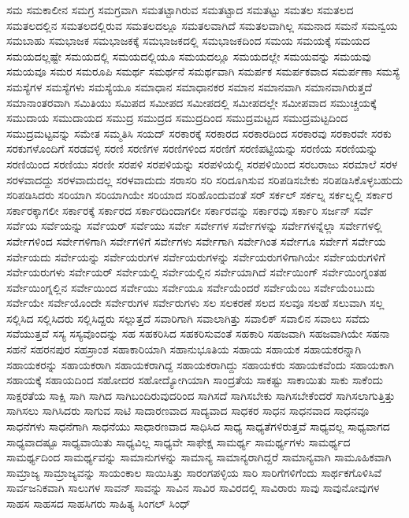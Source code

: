 {ಸಮ
ಸಮಕಾಲೀನ
ಸಮಗ್ರ
ಸಮಗ್ರವಾಗಿ
ಸಮತಟ್ಟಾಗಿರುವ
ಸಮತಟ್ಟಾದ
ಸಮತಟ್ಟು
ಸಮತಲ
ಸಮತಲದ
ಸಮತಲದಲ್ಲಿನ
ಸಮತಲದಲ್ಲಿರುವ
ಸಮತಲದಲ್ಲೂ
ಸಮತಲವಾಗಿದೆ
ಸಮತಲವಾಗಿಲ್ಲ
ಸಮನಾದ
ಸಮನೆ
ಸಮನ್ವಯ
ಸಮಬಾಹು
ಸಮಭಾಜಕ
ಸಮಭಾಜಕಕ್ಕೆ
ಸಮಭಾಜಕದಲ್ಲಿ
ಸಮಭಾಜಕದಿಂದ
ಸಮಯ
ಸಮಯಕ್ಕೆ
ಸಮಯದ
ಸಮಯದಲ್ಲಷ್ಟೇ
ಸಮಯದಲ್ಲಿ
ಸಮಯದಲ್ಲಿಯೂ
ಸಮಯದಲ್ಲೂ
ಸಮಯದಲ್ಲೇ
ಸಮಯವನ್ನು
ಸಮಯವು
ಸಮಯವೂ
ಸಮರ
ಸಮರೂಪಿ
ಸಮರ್ಥ
ಸಮರ್ಥನೆ
ಸಮರ್ಥವಾಗಿ
ಸಮರ್ಪಕ
ಸಮರ್ಪಕವಾದ
ಸಮರ್ಪಣಾ
ಸಮಸ್ಯೆ
ಸಮಸ್ಯೆಗಳ
ಸಮಸ್ಯೆಗಳು
ಸಮಸ್ಯೆಯೂ
ಸಮಾಧಾನ
ಸಮಾಧಾನಕರ
ಸಮಾನ
ಸಮಾನವಾಗಿ
ಸಮಾನವಾಗಿರುತ್ತದೆ
ಸಮಾನಾಂತರವಾಗಿ
ಸಮಿತಿಯು
ಸಮಿಪದ
ಸಮೀಪದ
ಸಮೀಪದಲ್ಲಿ
ಸಮೀಪದಲ್ಲೇ
ಸಮೀಪವಾದ
ಸಮುಚ್ಚಯಕ್ಕೆ
ಸಮುದಾಯ
ಸಮುದಾಯದ
ಸಮುದ್ರ
ಸಮುದ್ರದ
ಸಮುದ್ರದಿಂದ
ಸಮುದ್ರಮಟ್ಟದ
ಸಮುದ್ರಮಟ್ಟದಿಂದ
ಸಮುದ್ರಮಟ್ಟವನ್ನು
ಸಮೇತ
ಸಮ್ಮತಿಸಿ
ಸಯದ್
ಸರಕಾರಕ್ಕೆ
ಸರಕಾರದ
ಸರಕಾರದಿಂದ
ಸರಕಾರವು
ಸರಕಾರವೇ
ಸರಕು
ಸರಕುಗಳೊಂದಿಗೆ
ಸರಡವಳ್ಳಿ
ಸರಣಿ
ಸರಣಿಗಳ
ಸರಣಿಗಳಿಂದ
ಸರಣಿಗೆ
ಸರಣಿಪಟ್ಟಿಯನ್ನು
ಸರಣಿಯ
ಸರಣಿಯನ್ನು
ಸರಣಿಯಿಂದ
ಸರಣಿಯು
ಸರಣೀ
ಸರಪಳಿ
ಸರಪಳಿಯನ್ನು
ಸರಪಳಿಯಲ್ಲಿ
ಸರಪಳಿಯಿಂದ
ಸರಬರಾಜು
ಸರಮಾಲೆ
ಸರಳ
ಸರಳವಾದದ್ದು
ಸರಳವಾದುದಲ್ಲ
ಸರಳವಾದುದು
ಸರಾಸರಿ
ಸರಿ
ಸರಿದೂಗಿಸುವ
ಸರಿಪಡಿಸಬೇಕು
ಸರಿಪಡಿಸಿಕೊಳ್ಳಬಹುದು
ಸರಿಪಡಿಸಿದರು
ಸರಿಯಾಗಿ
ಸರಿಯಾಗಿಯೇ
ಸರಿಯಾದ
ಸರಿಹೊಂದುವಂತೆ
ಸರ್
ಸರ್ಕಲ್
ಸರ್ಕಲ್ನ
ಸರ್ಕಲ್ನಲ್ಲಿ
ಸರ್ಕಾರ
ಸರ್ಕಾರಕ್ಕಾಗಲೀ
ಸರ್ಕಾರಕ್ಕೆ
ಸರ್ಕಾರದ
ಸರ್ಕಾರದಿಂದಾಗಲೀ
ಸರ್ಕಾರವನ್ನು
ಸರ್ಕಾರವು
ಸರ್ಕಾರಿ
ಸರ್ಜನ್
ಸರ್ವೆ
ಸರ್ವೆಯ
ಸರ್ವೆಯನ್ನು
ಸರ್ವೆಯರ್
ಸರ್ವೆಯು
ಸರ್ವೇ
ಸರ್ವೇಗಳ
ಸರ್ವೇಗಳನ್ನು
ಸರ್ವೇಗಳನ್ನೆಲ್ಲಾ
ಸರ್ವೇಗಳಲ್ಲಿ
ಸರ್ವೇಗಳಿಂದ
ಸರ್ವೇಗಳಿಗಾಗಿ
ಸರ್ವೇಗಳಿಗೆ
ಸರ್ವೇಗಳು
ಸರ್ವೇಗಾಗಿ
ಸರ್ವೇಗಿಂತ
ಸರ್ವೇಗೂ
ಸರ್ವೇಗೆ
ಸರ್ವೇಯ
ಸರ್ವೇಯದು
ಸರ್ವೇಯನ್ನು
ಸರ್ವೇಯರುಗಳ
ಸರ್ವೇಯರುಗಳನ್ನು
ಸರ್ವೇಯರುಗಳಿಗಾಗಿಯೇ
ಸರ್ವೇಯರುಗಳಿಗೆ
ಸರ್ವೇಯರುಗಳು
ಸರ್ವೇಯರ್
ಸರ್ವೇಯಲ್ಲಿ
ಸರ್ವೇಯಲ್ಲಿನ
ಸರ್ವೇಯಾಗಿದೆ
ಸರ್ವೇಯಿಂಗ್
ಸರ್ವೇಯಿಂಗ್ನಂತಹ
ಸರ್ವೇಯಿಂಗ್ನಲ್ಲಿನ
ಸರ್ವೇಯಿಂದ
ಸರ್ವೇಯು
ಸರ್ವೇಯೂ
ಸರ್ವೇಯೆಂದರೆ
ಸರ್ವೇಯೆಂಬ
ಸರ್ವೇಯೆಂಬುದು
ಸರ್ವೇಯೇ
ಸರ್ವೇಯೊಂದೇ
ಸರ್ವೇರುಗಳ
ಸರ್ವೇರುಗಳು
ಸಲ
ಸಲಕರಣೆ
ಸಲದ
ಸಲವೂ
ಸಲಹೆ
ಸಲುವಾಗಿ
ಸಲ್ಲ
ಸಲ್ಲಿಸಿದ
ಸಲ್ಲಿಸಿದರು
ಸಲ್ಲಿಸಿದ್ದರು
ಸಲ್ಲುತ್ತದೆ
ಸವಾರಿಗಾಗಿ
ಸವಾಲಾಗಿತ್ತು
ಸವಾಲಿಕ್
ಸವಾಲಿನ
ಸವಾಲು
ಸವೆದು
ಸವೆಯುತ್ತವೆ
ಸಸ್ಯ
ಸಸ್ಯವೊಂದನ್ನು
ಸಹ
ಸಹಕರಿಸಿದ
ಸಹಕರಿಸುವಂತೆ
ಸಹಕಾರಿ
ಸಹಜವಾಗಿ
ಸಹಜವಾಗಿಯೇ
ಸಹನಾ
ಸಹನೆ
ಸಹರನಪುರ
ಸಹಸ್ರಾಂಶ
ಸಹಾಕಾರಿಯಾಗಿ
ಸಹಾನುಭೂತಿಯ
ಸಹಾಯ
ಸಹಾಯಕ
ಸಹಾಯಕರನ್ನಾಗಿ
ಸಹಾಯಕರನ್ನು
ಸಹಾಯಕರಾಗಿ
ಸಹಾಯಕರಾಗಿದ್ದ
ಸಹಾಯಕರಾಗಿದ್ದು
ಸಹಾಯಕರು
ಸಹಾಯಕವೆಂದು
ಸಹಾಯಕಾಗಿ
ಸಹಾಯಕ್ಕೆ
ಸಹಾಯದಿಂದ
ಸಹೋದರ
ಸಹೋದ್ಯೋಗಿಯಾಗಿ
ಸಾಂದ್ರತೆಯ
ಸಾಕಷ್ಟು
ಸಾಕಾಯಿತು
ಸಾಕು
ಸಾಕೆಂದು
ಸಾಕ್ಷರತೆಯ
ಸಾಕ್ಷಿ
ಸಾಗಿ
ಸಾಗಿದ
ಸಾಗಿಬಂದಿರುವುದರಿಂದ
ಸಾಗಿಸದೆ
ಸಾಗಿಸಬೇಕು
ಸಾಗಿಸಬೇಕೆಂದರೆ
ಸಾಗಿಸಲಾಗುತ್ತಿತ್ತು
ಸಾಗಿಸಲು
ಸಾಗಿಸಿದರು
ಸಾಗುವ
ಸಾಟಿ
ಸಾದಾರಣವಾದ
ಸಾದ್ಯವಾದ
ಸಾಧಕರ
ಸಾಧನ
ಸಾಧನವಾದ
ಸಾಧನವೂ
ಸಾಧನೆಗಳು
ಸಾಧನೆಗಾಗಿ
ಸಾಧನೆಯು
ಸಾಧಾರಣವಾದ
ಸಾಧಿಸಿದ
ಸಾಧ್ಯ
ಸಾಧ್ಯತೆಗಳಿರುತ್ತವೆ
ಸಾಧ್ಯವಲ್ಲ
ಸಾಧ್ಯವಾಗದ
ಸಾಧ್ಯವಾದಷ್ಟೂ
ಸಾಧ್ಯವಾಯಿತು
ಸಾಧ್ಯವಿಲ್ಲ
ಸಾಧ್ಯವೇ
ಸಾಫೇಕ್ಷ
ಸಾಮರ್ಥ್ಯ
ಸಾಮರ್ಥ್ಯಗಳು
ಸಾಮರ್ಥ್ಯದ
ಸಾಮರ್ಥ್ಯದಿಂದ
ಸಾಮರ್ಥ್ಯವನ್ನು
ಸಾಮಾನುಗಳನ್ನು
ಸಾಮಾನ್ಯ
ಸಾಮಾನ್ಯರಾಗಿದ್ದರೆ
ಸಾಮಾನ್ಯವಾಗಿ
ಸಾಮೂಹಿಕವಾಗಿ
ಸಾಮ್ರಾಜ್ಯ
ಸಾಮ್ರಾಜ್ಯವನ್ನು
ಸಾಯಂಕಾಲ
ಸಾಯಿಸಿತ್ತು
ಸಾರಂಗಪಳ್ಳಿಯ
ಸಾರಿ
ಸಾರಿಗೆಗಳಿಗೆಂದು
ಸಾರ್ಥಕಗೊಳಿಸಿವೆ
ಸಾರ್ವಜನಿಕವಾಗಿ
ಸಾಲುಗಳ
ಸಾವನ್
ಸಾವನ್ನು
ಸಾವಿನ
ಸಾವಿರ
ಸಾವಿರದಲ್ಲಿ
ಸಾವಿರಾರು
ಸಾವು
ಸಾವುನೋವುಗಳ
ಸಾಹಸ
ಸಾಹಸದ
ಸಾಹಸಿಗರು
ಸಾಹಿತ್ಯ
ಸಿಂಗಲ್
ಸಿಂಧ್
}
